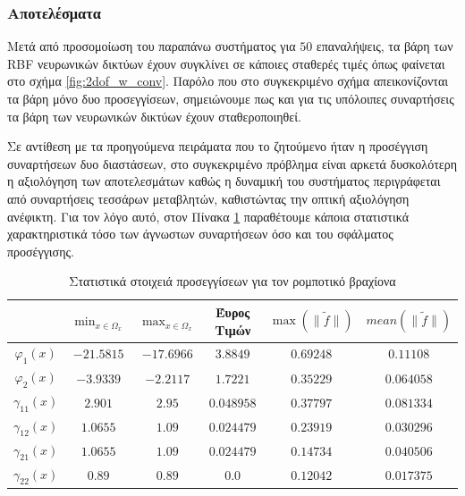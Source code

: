 \subsubsection{Αποτελέσματα}
Μετά από προσομοίωση του παραπάνω συστήματος για $50$ επαναλήψεις, τα βάρη των RBF νευρωνικών δικτύων έχουν συγκλίνει σε κάποιες σταθερές τιμές όπως φαίνεται στο σχήμα \ref{fig:2dof_w_conv}. Παρόλο που στο συγκεκριμένο σχήμα απεικονίζονται τα βάρη μόνο δυο προσεγγίσεων, σημειώνουμε πως και για τις υπόλοιπες συναρτήσεις τα βάρη των νευρωνικών δικτύων έχουν σταθεροποιηθεί.

Σε αντίθεση με τα προηγούμενα πειράματα που το ζητούμενο ήταν η προσέγγιση συναρτήσεων δυο διαστάσεων, στο συγκεκριμένο πρόβλημα είναι αρκετά δυσκολότερη η αξιολόγηση των αποτελεσμάτων καθώς η δυναμική του συστήματος περιγράφεται από συναρτήσεις τεσσάρων μεταβλητών, καθιστώντας την οπτική αξιολόγηση ανέφικτη. Για τον λόγο αυτό, στον Πίνακα \ref{tab:statistics_2dof} παραθέτουμε κάποια στατιστικά χαρακτηριστικά  τόσο των άγνωστων συναρτήσεων όσο και του σφάλματος προσέγγισης.

\begin{table}
	\centering
	\begin{tabular}{  c | c | c | c | c | c }
		& $\min_{x \in \Omega_x}$ & $\max_{x \in \Omega_x}$ & Έυρος Τιμών & $\max(\| \tilde{f} \| )$ & $mean(\| \tilde{f} \|)$  \\ \hline \hline
		$\varphi_1(x)$ & $-21.5815$ & $-17.6966$ & $3.8849$ & $ 0.69248$ & $0.11108$ \\
		$\varphi_2(x)$ & $-3.9339$ & $-2.2117$ & $1.7221$ & $ 0.35229$ & $0.064058$ \\
		$\gamma_{11}(x)$ & $2.901$ & $2.95$ & $0.048958$ & $ 0.37797$ & $0.081334$ \\
		$\gamma_{12}(x)$ & $1.0655$ & $1.09$ & $0.024479$ & $ 0.23919$ & $0.030296$ \\
		$\gamma_{21}(x)$ & $1.0655$ & $1.09$ & $0.024479$ & $ 0.14734$ & $0.040506$ \\
		$\gamma_{22}(x)$ & $0.89$ & $0.89$ & $0.0$ & $ 0.12042$ & $0.017375$ \\
	\end{tabular}
	\label{tab:statistics_2dof}
	\caption{Στατιστικά στοιχειά προσεγγίσεων για τον ρομποτικό βραχίονα}
\end{table}


